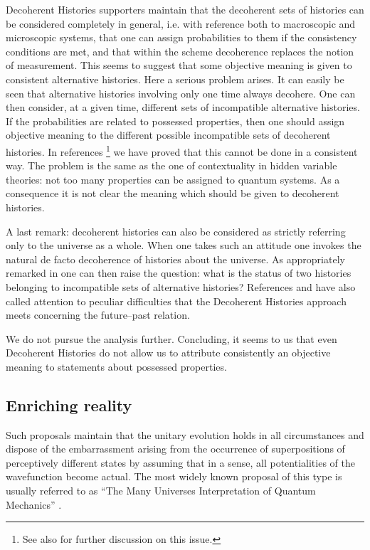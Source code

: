 \documentclass[10pt,a4paper]{article}
\begin{document}
Decoherent Histories supporters  maintain that the decoherent sets
of histories can be considered completely in general, i.e. with
reference both to macroscopic and microscopic systems, that one
can assign probabilities to them if the consistency conditions are
met, and  that within the scheme decoherence replaces the notion
of measurement. This seems to suggest that some objective meaning
is given to consistent alternative histories. Here a serious
problem arises. It can easily be seen that alternative histories
involving only one time always decohere. One can then consider, at
a given time, different sets of incompatible alternative
histories. If the probabilities are related to possessed
properties, then one should assign objective meaning to the
different possible incompatible sets of decoherent histories. In
references \cite{bg2,bgp98}\footnote{See also \cite{gri5,bg2b} for
further discussion on this issue.} we have proved that this cannot
be done in a consistent way. The problem is the same as the one of
contextuality in hidden variable theories: not too many properties
can be assigned to quantum systems. As a consequence it is not
clear the meaning which should be given to decoherent histories.

A last remark: decoherent histories can also be considered as
strictly referring only to the universe as a whole. When one takes
such an attitude one invokes the natural de facto decoherence of
histories about the universe. As appropriately remarked in
\cite{rim2} one can then raise the question: what is the status of
two histories belonging to incompatible sets of alternative
histories? References \cite{rim2} and \cite{de3} have also called
attention to peculiar difficulties that the Decoherent Histories
approach meets concerning the future--past relation.

We do not pursue the analysis further. Concluding, it seems to us
that even Decoherent Histories  do not allow us  to attribute
consistently an objective meaning to statements about possessed
properties.


\subsection{Enriching reality} \label{sec36}

Such proposals \cite{ev1,dw1,dw2,de1,al7,al5} maintain that the
unitary evolution holds in all circumstances and dispose of the
embarrassment arising from the occurrence of superpositions of
perceptively different states by assuming that in a sense, all
potentialities of the wavefunction become actual. The most widely
known proposal of this type is usually referred to as ``The Many
Universes Interpretation of Quantum Mechanics''
\cite{de1,al7,al5}.
\end{document}
